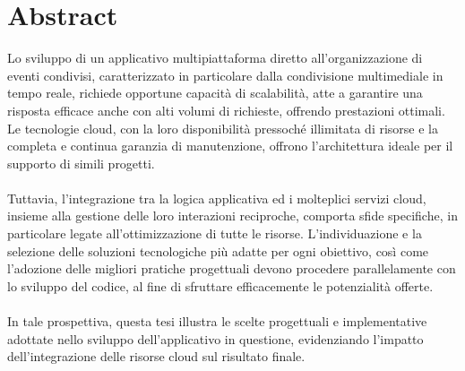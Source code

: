 

\chapter*{Abstract}


Lo sviluppo di un applicativo multipiattaforma diretto all’organizzazione di eventi condivisi, caratterizzato in particolare dalla condivisione multimediale in tempo reale, 
richiede opportune capacità di scalabilità, atte a garantire una risposta efficace anche con alti volumi di richieste, offrendo prestazioni ottimali. 
Le tecnologie cloud, con la loro disponibilità pressoché illimitata di risorse e la completa e continua garanzia  di manutenzione, 
offrono l'architettura ideale per il supporto di simili progetti.\\
\\
Tuttavia, l'integrazione tra la logica applicativa ed i molteplici servizi cloud, 
insieme alla gestione delle loro interazioni reciproche, comporta sfide specifiche, in particolare legate all'ottimizzazione di tutte le risorse.
L’individuazione e la selezione delle soluzioni tecnologiche più adatte per ogni obiettivo, 
così come l'adozione delle migliori pratiche progettuali devono procedere parallelamente con lo sviluppo del codice, al fine di sfruttare efficacemente le potenzialità offerte.\\
\\
In tale prospettiva, questa tesi illustra le scelte progettuali e implementative adottate nello sviluppo dell'applicativo in questione, 
evidenziando l’impatto dell'integrazione delle risorse cloud sul risultato finale.\\


\clearpage